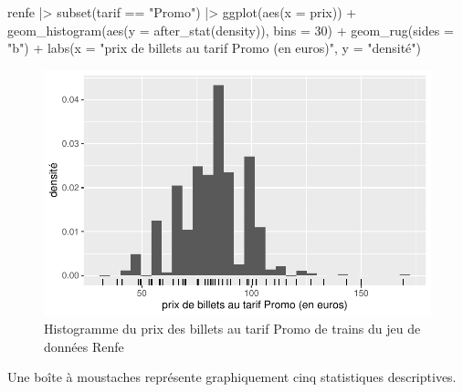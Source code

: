 \documentclass[
  11pt,
  letterpaper,
]{scrbook}
\newenvironment{Shaded}{\begin{snugshade}}{\end{snugshade}}
\newcommand{\AttributeTok}[1]{\textcolor[rgb]{0.40,0.45,0.13}{#1}}
\newcommand{\DecValTok}[1]{\textcolor[rgb]{0.68,0.00,0.00}{#1}}
\newcommand{\FunctionTok}[1]{\textcolor[rgb]{0.28,0.35,0.67}{#1}}
\newcommand{\NormalTok}[1]{\textcolor[rgb]{0.00,0.23,0.31}{#1}}
\newcommand{\SpecialCharTok}[1]{\textcolor[rgb]{0.37,0.37,0.37}{#1}}
\newcommand{\StringTok}[1]{\textcolor[rgb]{0.13,0.47,0.30}{#1}}
\theoremstyle{definition}
\theoremstyle{remark}
\begin{document}
\begin{Shaded}
\begin{Highlighting}[]
\NormalTok{renfe }\SpecialCharTok{|\textgreater{}}
  \FunctionTok{subset}\NormalTok{(tarif }\SpecialCharTok{==} \StringTok{"Promo"}\NormalTok{) }\SpecialCharTok{|\textgreater{}}
  \FunctionTok{ggplot}\NormalTok{(}\FunctionTok{aes}\NormalTok{(}\AttributeTok{x =}\NormalTok{ prix)) }\SpecialCharTok{+} 
    \FunctionTok{geom\_histogram}\NormalTok{(}\FunctionTok{aes}\NormalTok{(}\AttributeTok{y =} \FunctionTok{after\_stat}\NormalTok{(density)), }
                   \AttributeTok{bins =} \DecValTok{30}\NormalTok{) }\SpecialCharTok{+}
    \FunctionTok{geom\_rug}\NormalTok{(}\AttributeTok{sides =} \StringTok{"b"}\NormalTok{) }\SpecialCharTok{+} 
    \FunctionTok{labs}\NormalTok{(}\AttributeTok{x =} \StringTok{"prix de billets au tarif Promo (en euros)"}\NormalTok{, }
         \AttributeTok{y =} \StringTok{"densité"}\NormalTok{) }
\end{Highlighting}
\end{Shaded}

\begin{figure}[ht!]

{\centering \includegraphics[width=1\textwidth,height=\textheight]{analyseexploratoire_files/figure-pdf/fig-histrenfe-1.pdf}

}

\caption{\label{fig-histrenfe}Histogramme du prix des billets au tarif
Promo de trains du jeu de données Renfe}

\end{figure}

Une boîte à moustaches représente graphiquement cinq statistiques
descriptives.
\end{document}
